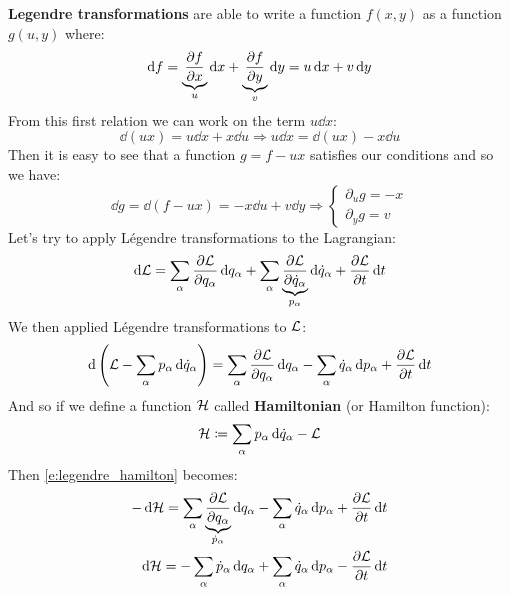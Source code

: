 \textbf{Legendre transformations} are able to write a function $f(x,y)$ as a function $g(u,y)$ where:
\begin{equation}
    \dd{f} = \underbrace{\pdv{f}{x}}_u \dd{x} + \underbrace{\pdv{f}{y}}_v \dd{y} = u\dd{x} + v\dd{y}
\end{equation}
From this first relation we can work on the term $u\dd{x}$:
\begin{equation}
    \dd{(ux)} = u\dd{x} + x\dd{u} \Rightarrow u\dd{x} = \dd{(ux)} - x\dd{u}
\end{equation}
Then it is easy to see that a function $g = f-ux$ satisfies our conditions and so we have:
\begin{equation}
    \dd{g} = \dd{(f-ux)} = - x\dd{u} + v\dd{y} \Rightarrow \begin{cases}
        \partial_{u} g = -x\\
        \partial_{y} g = v
    \end{cases}
\end{equation}
Let's try to apply Légendre transformations to the Lagrangian:
\begin{equation}
    \dd{\lagr} = \bigsum_{\alpha} \pdv{\lagr}{q_{\alpha}}\dd{q_{\alpha}} + \bigsum_{\alpha} \underbrace{\pdv{\lagr}{\dot{q}_{\alpha}}}_{p_{\alpha}}\dd{\dot{q}_{\alpha}} + \pdv{\lagr}{t}\dd{t}
\end{equation}
We then applied Légendre transformations to $\mathcal{L}$:
\begin{equation} \label{e:legendre_hamilton}
    \dd{\brackets{\lagr - \bigsum_{\alpha} p_{\alpha}\dd{\dot{q}_{\alpha}}}} = \bigsum_{\alpha} \pdv{\lagr}{q_{\alpha}}\dd{q_{\alpha}} - \bigsum_{\alpha} \dot{q}_{\alpha}\dd{p_{\alpha}} + \pdv{\lagr}{t}\dd{t}
\end{equation}
And so if we define a function $\mathcal{H}$ called \textbf{Hamiltonian} (or Hamilton function):
\begin{equation}
    \mathcal{H} \coloneqq \displaystyle\sum_{\alpha} p_{\alpha}\dd{\dot{q}_{\alpha}} -\mathcal{L}
\end{equation}
Then \eqref{e:legendre_hamilton} becomes:
\begin{equation}
    \begin{split}
        -\dd{\hamfun} = \bigsum_{\alpha} \underbrace{\pdv{\lagr}{q_{\alpha}}}_{\dot{p}_{\alpha}}\dd{q_{\alpha}} - \bigsum_{\alpha} \dot{q}_{\alpha}\dd{p_{\alpha}} + \pdv{\lagr}{t}\dd{t}\\
        \dd{\hamfun} = -\bigsum_{\alpha} \dot{p}_{\alpha}\dd{q_{\alpha}} + \bigsum_{\alpha} \dot{q}_{\alpha}\dd{p_{\alpha}} - \pdv{\lagr}{t}\dd{t}\\
    \end{split}
\end{equation}
